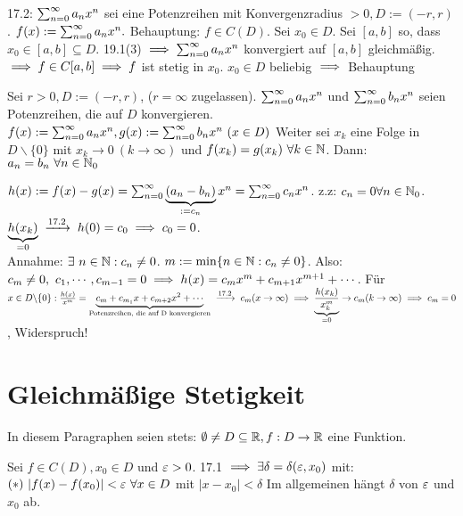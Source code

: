 \documentclass[a4paper,oneside,DIV15,BCOR12mm]{scrbook}
\begin{document}
\begin{beweis}
17.2: $\sum_{n=0}^{\infty}{a_nx^n}$ sei eine Potenzreihen mit Konvergenzradius $>0, D:=(-r, r)$. $f(x):=\sum_{n=0}^{\infty}{a_nx^n}.$ Behauptung: $f\in C(D)$. Sei $x_0 \in D$. Sei $[a, b]$ so, dass $x_0 \in [a, b] \subseteq D$. 19.1(3) $\implies \sum_{n=0}^{\infty}{a_nx^n}$ konvergiert auf $[a, b]$ gleichmäßig. $\implies f \in C[a, b] \implies f$ ist stetig in $x_0$. $x_0 \in D$ beliebig $\implies$ Behauptung
\end{beweis}

\begin{satz}
Sei $r>0, D:=(-r, r)$, ($r=\infty$ zugelassen). $\sum_{n=0}^{\infty}{a_nx^n}$ und $\sum_{n=0}^{\infty}{b_nx^n}$ seien Potenzreihen, die auf $D$ konvergieren. $f(x):=\reihenull{a_nx^n},  g(x):=\reihenull{b_nx^n}\ (x\in D)$ Weiter sei $x_k$ eine Folge in $D\backslash \{0\}$ mit $x_k \to 0\ (k\to \infty)$ und $f(x_k)=g(x_k)\ \forall k \in \mathbb{N}$. Dann: $a_n=b_n\ \forall n\in\mathbb{N}_{0}$
\end{satz}

\begin{beweis}
$h(x):=f(x)-g(x) = \sum_{n=0}^{\infty}{\underbrace{(a_n-b_n)}_{:=c_n}x^n} = \sum_{n=0}^{\infty}{c_nx^n}$. z.z: $c_n=0\forall n\in\mathbb{N}_0$. $\underbrace{h(x_k)}_{=0}\tonach{17.2} h(0)=c_0\folgt c_0=0$.\\
 Annahme: $\exists\ n\in\mathbb{N}: c_n\ne0$. $m:=\min\{n\in\mathbb{N}: c_n\ne0\}$.  Also: $c_m\ne0,\ c_1, \cdots, c_{m-1}=0 \implies h(x)=c_mx^m+c_{m+1}x^{m+1}+\cdots$. Für $x\in D\backslash \{0\}: \frac{h(x)}{x^m}=\underbrace{c_m+c_{m_1}x+c_{m+2}x^2+\cdots}_{\text{Potenzreihen, die auf D konvergieren}}\tonach{17.2} c_m (x \to \infty) \folgt \underbrace{\frac{h(x_k)}{x^m_k}}_{=0}\to c_m(k\to\infty) \folgt c_m=0$, Widerspruch!
\end{beweis}

\chapter{Gleichmäßige Stetigkeit}

\begin{vereinbarung}
In diesem Paragraphen seien stets: $\emptyset \ne D \subseteq \mathbb{R}, f: D \to \mathbb{R}$ eine Funktion.
\end{vereinbarung}
\begin{erinnerung}
Sei $f \in C(D), x_0 \in D$ und $\varepsilon>0$. 17.1 $\implies \exists \delta=\delta(\varepsilon,x_0)$ mit: $(*)\ |f(x)-f(x_0)|<\varepsilon\ \forall x \in D$ mit $|x-x_0|<\delta$ Im allgemeinen hängt $\delta$ von $\varepsilon$ und $x_0$ ab.
\end{erinnerung}
\end{document}
